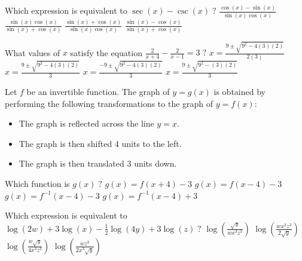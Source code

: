 \begin{question}
Which expression is equivalent to \(\sec(x) - \csc(x) \; ?\)
\choices
{\(\frac{\cos(x) - \sin(x)}{\sin(x) \cos(x)}\)}
{\(\frac{\sin(x) \cos(x)}{\sin(x) + \cos(x)}\)}
{\(\frac{\sin(x) + \cos(x)}{\sin(x) \cos(x)}\)}
{}
{\(\frac{\sin(x) - \cos(x)}{\sin(x) + \cos(x)}\)}
\end{question}

\begin{question}
What values of \(x\) satisfy the equation \(\frac{2}{x + 4} - \frac{2}{x - 1} = 3 \; ?\)
\choices
{\(x = \frac{9 \pm \sqrt{9^2 - 4(3)(2)}}{2(3)}\)}
{}
{\(x = \frac{9 \pm \sqrt{9^2 - 4(3)(2)}}{3}\)}
{\(x = \frac{-9 \pm \sqrt{9^2 - 4(3)(2)}}{3}\)}
{\(x = \frac{9 \pm \sqrt{9^2 - (3)(2)}}{3}\)}
\end{question}

\begin{question}
Let \(f\) be an invertible function. The graph of \(y = g(x)\) is obtained by performing the following transformations to the graph of \(y = f(x)\):
\begin{itemize}
    \item 
    The graph is reflected across the line \(y = x.\)
    \item
    The graph is then shifted 4 units to the left.
    \item
    The graph is then translated 3 units down.
\end{itemize}
Which function is \(g(x) \; ?\)
\choices
{\(g(x) = f(x + 4) - 3\)}
{\(g(x) = f(x - 4) - 3\)}
{}
{\(g(x) = f^{-1}(x - 4) - 3\)}
{\(g(x) = f^{-1}(x - 4) + 3\)}
\end{question}

\begin{question}
Which expression is equivalent to \(\log(2w) + 3 \log(x) - \frac{1}{2} \log(4y) + 3 \log(z) \; ?\)
\choices
{\(\log \left(\frac{\sqrt y}{wx^3 z^3}\right)\)}
{\(\log \left(\frac{wx^3 z^3}{2 \sqrt y}\right)\)}
{\(\log \left(\frac{w \sqrt y}{4x^3 z^3}\right)\)}
{\(\log \left(\frac{wz^3}{2x^3 \sqrt y}\right)\)}
{}
\end{question}